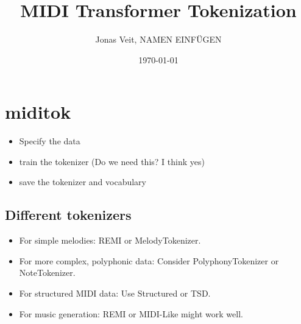 \documentclass{article}
\title{MIDI Transformer Tokenization}
\author{Jonas Veit, NAMEN EINFÜGEN }
\date{\today}
\begin{document}
    \maketitle
    \section*{miditok}
    \begin{itemize}
        \item Specify the data
        \item train the tokenizer (Do we need this? I think yes) 
        \item save the tokenizer and vocabulary
    \end{itemize}
    
    \subsection*{Different tokenizers}
    \begin{itemize}
        \item For simple melodies: REMI or MelodyTokenizer.
        \item For more complex, polyphonic data: Consider PolyphonyTokenizer or NoteTokenizer.
        \item For structured MIDI data: Use Structured or TSD.
        \item For music generation: REMI or MIDI-Like might work well.
    \end{itemize}
    
\end{document}
